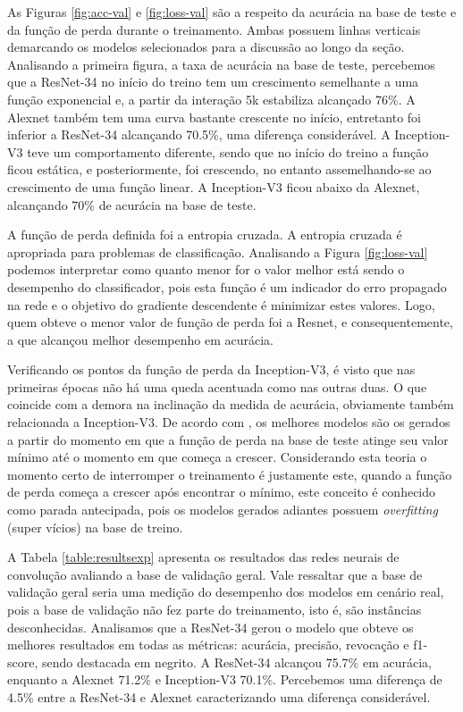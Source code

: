 As Figuras \ref{fig:acc-val} e \ref{fig:loss-val} são a respeito da acurácia na base de teste e da função de perda durante o treinamento. Ambas possuem linhas verticais demarcando os modelos selecionados para a discussão ao longo da seção. Analisando a primeira figura, a taxa de acurácia na base de teste, percebemos que a ResNet-34 no início do treino tem um crescimento semelhante a uma função exponencial e, a partir da interação 5k estabiliza alcançado 76\%. A Alexnet também tem uma curva bastante crescente no início, entretanto foi inferior a ResNet-34 alcançando 70.5\%, uma diferença considerável. A Inception-V3 teve um comportamento diferente, sendo que no início do treino a função ficou estática, e posteriormente, foi crescendo, no entanto assemelhando-se ao crescimento de uma função linear. A Inception-V3 ficou abaixo da Alexnet, alcançando 70\% de acurácia na base de teste. 

A função de perda definida foi a entropia cruzada. A entropia cruzada é apropriada para problemas de classificação. Analisando a Figura \ref{fig:loss-val} podemos interpretar como quanto menor for o valor melhor está sendo o desempenho do classificador, pois esta função é um indicador do erro propagado na rede e o objetivo do gradiente descendente é minimizar estes valores. Logo, quem obteve o menor valor de função de perda foi a Resnet, e consequentemente, a que alcançou melhor desempenho em acurácia. 

Verificando os pontos da função de perda da Inception-V3, é visto que nas primeiras épocas não há uma queda acentuada como nas outras duas. O que coincide com a demora na inclinação da medida de acurácia, obviamente também relacionada a Inception-V3. De acordo com \cite{geron2017hands}, os melhores modelos são os gerados a partir do momento em que a função de perda na base de teste atinge seu valor mínimo até o momento em que começa a crescer. Considerando esta teoria o momento certo de interromper o treinamento é justamente este, quando a função de perda começa a crescer após encontrar o mínimo, este conceito é conhecido como parada antecipada, pois os modelos gerados adiantes possuem \textit{overfitting} (super vícios) na base de treino.

A Tabela \ref{table:resultsexp} apresenta os resultados das redes neurais de convolução avaliando a base de validação geral. Vale ressaltar que a base de validação geral seria uma medição do desempenho dos modelos em cenário real, pois a base de validação não fez parte do treinamento, isto é, são instâncias desconhecidas. Analisamos que a ResNet-34 gerou o modelo que obteve os melhores resultados em todas as métricas: acurácia, precisão, revocação e f1-score, sendo destacada em negrito. A ResNet-34 alcançou 75.7\% em acurácia, enquanto a Alexnet 71.2\% e Inception-V3 70.1\%. Percebemos uma diferença de 4.5\% entre a ResNet-34 e Alexnet caracterizando uma diferença considerável. 

